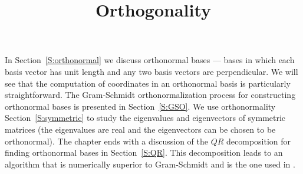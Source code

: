 \documentclass{ximera}
\title{Orthogonality}
\begin{document}
\begin{abstract}
\end{abstract}
\maketitle

\normalsize


In Section~\ref{S:orthonormal} we discuss orthonormal bases --- bases in
which each basis vector has unit length and any two basis vectors are 
perpendicular.
We will see that the computation of coordinates in an orthonormal basis is
particularly straightforward.  
The  Gram-Schmidt
orthonormalization process for constructing orthonormal bases is presented in 
Section~\ref{S:GSO}.  We
use orthonormality Section~\ref{S:symmetric} to study
the eigenvalues and eigenvectors of symmetric matrices (the eigenvalues are
real and the eigenvectors can be chosen to be orthonormal).   The chapter ends with a discussion of the $QR$
decomposition for finding orthonormal bases in Section~\ref{S:QR}.  This
decomposition leads to an algorithm that is numerically superior to
Gram-Schmidt and is the one used in \Matlabp.
\end{document}
